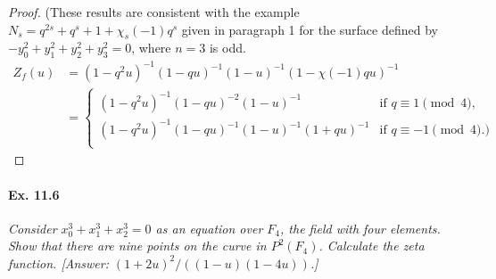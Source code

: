 \documentclass[11pt,a4paper]{article}
\begin{document}
\begin{proof}
(These results are consistent with the example $N_s = q^{2s} + q^s + 1 +\chi_s(-1) q^s$ given in paragraph 1 for the surface defined by $-y_0^2 + y_1^2 + y_2^2 + y_3^2 =0$, where $n=3$ is odd.
\begin{align*}
Z_f(u) &= (1-q^2u)^{-1}(1-qu)^{-1}(1-u)^{-1} (1 - \chi(-1) qu)^{-1}\\
&=
\left\{
\begin{array}{ll}
(1-q^2u)^{-1}(1-qu)^{-2}(1-u)^{-1}  & \text{if } q \equiv 1 \pmod 4,\\
(1-q^2u)^{-1}(1-qu)^{-1}(1-u)^{-1}(1+qu)^{-1} & \text{if } q \equiv -1 \pmod 4.)\\
\end{array}
\right.
\end{align*}
\end{proof}


\paragraph{Ex. 11.6}{\it Consider $x_0^3 + x_1^3 + x_2^3 = 0$ as an equation over $F_4$, the field with four elements. Show that there are nine points on the curve in $P^2(F_4)$. Calculate the zeta function. [Answer: $(1+2u)^2/((1-u)(1-4u))$.]
}
\end{document}

